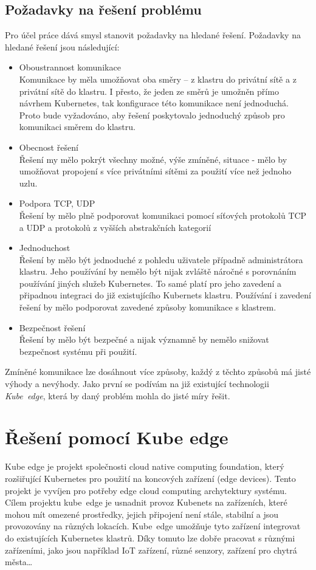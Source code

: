 \subsection{Požadavky na řešení problému}\label{sec:pozadavky}
Pro účel práce dává smysl stanovit požadavky na hledané řešení. Požadavky na hledané řešení jsou následující:
\begin{itemize}
    \item Oboustrannost komunikace\\
    Komunikace by měla umožňovat oba směry -- z klastru do privátní sítě a z privátní sítě do klastru. I přesto, že jeden ze směrů je umožněn přímo návrhem Kubernetes, tak konfigurace této komunikace není jednoduchá. Proto bude vyžadováno, aby řešení poskytovalo jednoduchý způsob pro komunikaci směrem do klastru.    
    \item Obecnost řešení\\
    Řešení my mělo pokrýt všechny možné, výše zmíněné, situace - mělo by umožňovat propojení s více privátními sítěmi za použití více než jednoho uzlu.
    \item Podpora TCP, UDP\\
    Řešení by mělo plně podporovat komunikaci pomocí síťových protokolů TCP a UDP a protokolů z vyšších abstrakčních kategorií
    \item Jednoduchost\\
    Řešení by mělo být jednoduché z pohledu uživatele případně administrátora klastru. Jeho používání by nemělo být nijak zvláště náročné s porovnáním používání jiných služeb Kubernetes. To samé platí pro jeho zavedení a připadnou integraci do již existujícího Kubernets klastru. Používání i zavedení řešení by mělo podporovat zavedené způsoby komunikace s klastrem.
    \item Bezpečnost řešení\\
    Řešení by mělo být bezpečné a nijak významně by nemělo snižovat bezpečnost systému při použití.
\end{itemize}
\bigskip\medskip
Zmíněné komunikace lze dosáhnout více způsoby, každý z těchto způsobů má jisté výhody a nevýhody. Jako první se podívám na již existující technologii \textit{Kube~edge}, která by daný problém mohla do jisté míry řešit.
\section{Řešení pomocí Kube edge}
Kube edge je projekt společnosti cloud native computing foundation, který rozšiřující Kubernetes pro použití na koncových zařízení (edge devices). Tento projekt je vyvíjen pro potřeby edge cloud computing archytektury systému.\cite{bigelow_2021_what} Cílem projektu kube~edge je usnadnit provoz Kubenets na zařízeních, které mohou mít omezené prostředky, jejich připojení není stále, stabilní a jsou provozovány na různých lokacích. Kube~edge umožňuje tyto zařízení integrovat do existujících Kubernetes klastrů. Díky tomuto lze dobře pracovat s různými zařízeními, jako jsou například IoT zařízení, různé senzory, zařízení pro chytrá města\ldots \cite{kubeedgeprojectauthors_2023_kubeedge}

